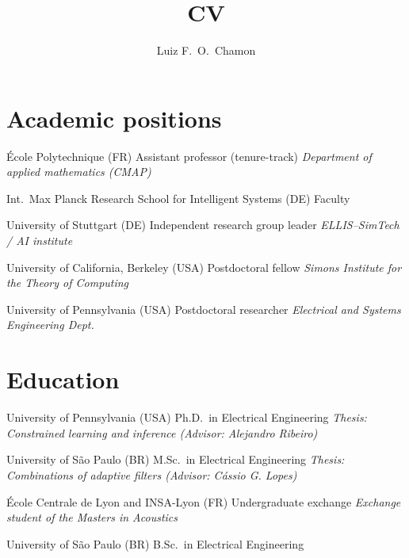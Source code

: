 \documentclass{cvlfoc}
\author[Luiz F.\ O.\ Chamon]{Luiz F.\ O.\ Chamon}
\title{CV}
\begin{document}
\maketitle
{}


\vspace{8mm}

\section*{Academic positions}

\begin{entrydate}
		{\'{E}cole Polytechnique (FR)}
		{Assistant professor (tenure-track)}
		{\emph{Department of applied mathematics (CMAP)}}

		{Int.\ Max Planck Research School for Intelligent Systems (DE)}
		{Faculty}
		{}

		{University of Stuttgart (DE)}
		{Independent research group leader}
		{\emph{ELLIS--SimTech / AI institute}}

		{University of California, Berkeley (USA)}
		{Postdoctoral fellow}
		{\emph{Simons Institute for the Theory of Computing}}

		{University of Pennsylvania (USA)}
		{Postdoctoral researcher}
		{\emph{Electrical and Systems Engineering Dept.}}
\end{entrydate}

\vspace{2mm}


\section*{Education}

\begin{entrydate}
		{University of Pennsylvania (USA)}
		{Ph.D.\ in Electrical Engineering}
		{\emph{Thesis: Constrained learning and inference
			\hfill(Advisor: Alejandro Ribeiro)}}

		{University of S\~{a}o Paulo (BR)}
		{M.Sc.\ in Electrical Engineering}
		{\emph{Thesis: Combinations of adaptive filters
			\hfill(Advisor: C\'{a}ssio G. Lopes)}}

		{École Centrale de Lyon {\normalfont and} INSA-Lyon (FR)}
		{Undergraduate exchange}
		{\textit{Exchange student of the Masters in Acoustics}}

		{University of S\~{a}o Paulo (BR)}
		{B.Sc.\ in Electrical Engineering}
		{}
\end{entrydate}
\end{document}
